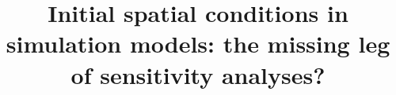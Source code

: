 \documentclass[Royal,sageh,times]{sagej}
\begin{document}


\runninghead{}

\title{Initial spatial conditions in simulation models: the missing leg of sensitivity analyses?}

\author{}







\end{document}
